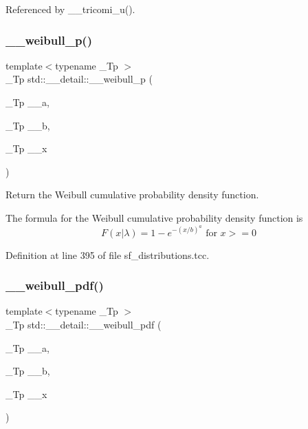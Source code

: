 Referenced by \+\_\+\+\_\+tricomi\+\_\+u().

\mbox{\label{namespacestd_1_1____detail_a3a488f2c4057fb927c0e79263a311481}} 
\subsubsection{\texorpdfstring{\+\_\+\+\_\+weibull\+\_\+p()}{\_\_weibull\_p()}}
{\footnotesize\ttfamily template$<$typename \+\_\+\+Tp $>$ \\
\+\_\+\+Tp std\+::\+\_\+\+\_\+detail\+::\+\_\+\+\_\+weibull\+\_\+p (\begin{DoxyParamCaption}\item[{\+\_\+\+Tp}]{\+\_\+\+\_\+a,  }\item[{\+\_\+\+Tp}]{\+\_\+\+\_\+b,  }\item[{\+\_\+\+Tp}]{\+\_\+\+\_\+x }\end{DoxyParamCaption})}



Return the Weibull cumulative probability density function. 

The formula for the Weibull cumulative probability density function is \[ F(x|\lambda) = 1 - e^{-(x / b)^a} \mbox{ for } x >= 0 \] 

Definition at line 395 of file sf\+\_\+distributions.\+tcc.

\mbox{\label{namespacestd_1_1____detail_ab15a21521bc750303938a108c5a0bb0b}} 
\subsubsection{\texorpdfstring{\+\_\+\+\_\+weibull\+\_\+pdf()}{\_\_weibull\_pdf()}}
{\footnotesize\ttfamily template$<$typename \+\_\+\+Tp $>$ \\
\+\_\+\+Tp std\+::\+\_\+\+\_\+detail\+::\+\_\+\+\_\+weibull\+\_\+pdf (\begin{DoxyParamCaption}\item[{\+\_\+\+Tp}]{\+\_\+\+\_\+a,  }\item[{\+\_\+\+Tp}]{\+\_\+\+\_\+b,  }\item[{\+\_\+\+Tp}]{\+\_\+\+\_\+x }\end{DoxyParamCaption})}



